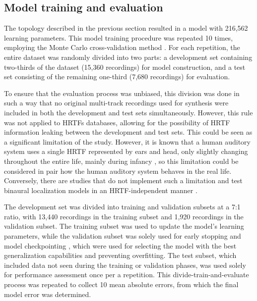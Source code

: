 \documentclass{article}
\begin{document}
\subsection{Model training and evaluation}
\label{subsec:training_evaluation}

The topology described in the previous section resulted in a model with 216,562 learning parameters. This model training procedure was repeated 10 times, employing the Monte Carlo cross-validation method \parencite{kuhn_applied_2013}. For each repetition, the entire dataset was randomly divided into two parts: a development set containing two-thirds of the dataset (15,360 recordings) for model construction, and a test set consisting of the remaining one-third (7,680 recordings) for evaluation.

To ensure that the evaluation process was unbiased, this division was done in such a way that no original multi-track recordings used for synthesis were included in both the development and test sets simultaneously. However, this rule was not applied to HRTFs databases, allowing for the possibility of HRTF information leaking between the development and test sets. This could be seen as a significant limitation of the study. However, it is known that a human auditory system uses a single HRTF represented by ears and head, only slightly changing throughout the entire life, mainly during infancy \parencite{clifton_growth_1988, king_how_2001}, so this limitation could be considered in pair how the human auditory system behaves in the real life. Conversely, there are studies that do not implement such a limitation and test binaural localization models in an HRTF-independent manner \parencite{zielinski_spatial_2022, zielinski_automatic_2022,antoniuk_blind_2023}.

The development set was divided into training and validation subsets at a 7:1 ratio, with 13,440 recordings in the training subset and 1,920 recordings in the validation subset. The training subset was used to update the model's learning parameters, while the validation subset was solely used for early stopping \parencite{pocock_practical_1989, morgan_generalization_1989} and model checkpointing \parencite{eisenman_check-n-run_2020}, which were used for selecting the model with the best generalization capabilities and preventing overfitting. The test subset, which included data not seen during the training or validation phases, was used solely for performance assessment once per a repetition. This divide-train-and-evaluate process was repeated to collect 10 mean absolute errors, from which the final model error was determined.
\end{document}
